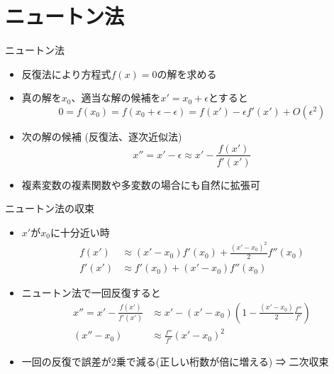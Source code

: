 \documentclass[dvipdfmx]{beamer}
\begin{document}
\section{ニュートン法}

\begin{frame}[t,fragile]{ニュートン法}
  \begin{itemize}
    \setlength{\itemsep}{1em}
  \item 反復法により方程式$f(x)=0$の解を求める
  \item 真の解を$x_0$、適当な解の候補を$x'=x_0+\epsilon$とすると
    \[
    0 = f(x_0) = f(x_0+\epsilon-\epsilon) = f(x') - \epsilon f'(x') + O(\epsilon^2)
    \]
  \item 次の解の候補 (反復法、逐次近似法)
    \[
    x'' = x'-\epsilon \approx x' - \frac{f(x')}{f'(x')}
    \]
  \item 複素変数の複素関数や多変数の場合にも自然に拡張可
  \end{itemize}
\end{frame}

\begin{frame}[t,fragile]{ニュートン法の収束}
  \begin{itemize}
    \setlength{\itemsep}{1em}
  \item $x'$が$x_0$に十分近い時
    \begin{align*}
      f(x') &\approx (x'-x_0) f'(x_0) + \frac{(x' - x_0)^2}{2} f''(x_0) \\
      f'(x') &\approx f'(x_0) + (x' - x_0) f''(x_0)
    \end{align*}
  \item ニュートン法で一回反復すると
    \begin{align*}
      x'' =  x' - \frac{f(x')}{f'(x')} &\approx x' - (x'-x_0)(1-\frac{(x'-x_0)}{2}\frac{f''}{f'}) \\
      (x''-x_0) &\approx \frac{f''}{f'} (x' - x_0)^2
    \end{align*}
    \item 一回の反復で誤差が2乗で減る(正しい桁数が倍に増える) ⇒ 二次収束
  \end{itemize}
\end{frame}
\end{document}
